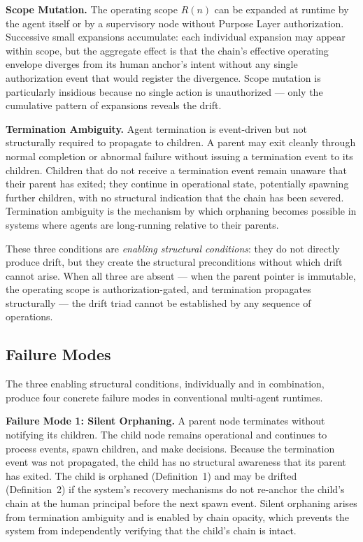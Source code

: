 \medskip
\noindent\textbf{Scope Mutation.} The operating scope $R(n)$ can be expanded at runtime by the agent itself or by a supervisory node without Purpose Layer authorization. Successive small expansions accumulate: each individual expansion may appear within scope, but the aggregate effect is that the chain's effective operating envelope diverges from its human anchor's intent without any single authorization event that would register the divergence. Scope mutation is particularly insidious because no single action is unauthorized — only the cumulative pattern of expansions reveals the drift.

\medskip
\noindent\textbf{Termination Ambiguity.} Agent termination is event-driven but not structurally required to propagate to children. A parent may exit cleanly through normal completion or abnormal failure without issuing a termination event to its children. Children that do not receive a termination event remain unaware that their parent has exited; they continue in operational state, potentially spawning further children, with no structural indication that the chain has been severed. Termination ambiguity is the mechanism by which orphaning becomes possible in systems where agents are long-running relative to their parents.

These three conditions are \emph{enabling structural conditions}: they do not directly produce drift, but they create the structural preconditions without which drift cannot arise. When all three are absent — when the parent pointer is immutable, the operating scope is authorization-gated, and termination propagates structurally — the drift triad cannot be established by any sequence of operations.

\subsection{Failure Modes}

The three enabling structural conditions, individually and in combination, produce four concrete failure modes in conventional multi-agent runtimes.

\medskip
\noindent\textbf{Failure Mode 1: Silent Orphaning.} A parent node terminates without notifying its children. The child node remains operational and continues to process events, spawn children, and make decisions. Because the termination event was not propagated, the child has no structural awareness that its parent has exited. The child is orphaned (Definition~1) and may be drifted (Definition~2) if the system's recovery mechanisms do not re-anchor the child's chain at the human principal before the next spawn event. Silent orphaning arises from termination ambiguity and is enabled by chain opacity, which prevents the system from independently verifying that the child's chain is intact.

